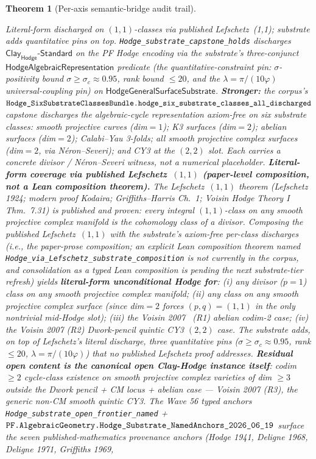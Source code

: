 \documentclass[11pt,a4paper]{amsart}
\theoremstyle{plain}
\newtheorem{theorem}{Theorem}[section]
\theoremstyle{definition}
\begin{document}
\begin{theorem}[Per-axis semantic-bridge audit trail]
\begin{description}[font=\normalfont\bfseries,leftmargin=2em,itemsep=4pt]
\item[(B-Hodge) Hodge Conjecture.] \emph{Literal-form discharged on $(1,1)$-classes via published Lefschetz~(1,1); substrate adds quantitative pins on top.} \texttt{Hodge\_substrate\_capstone\_holds} discharges $\textsf{Clay}_{\textsf{Hodge}}\textsf{-Standard}$ on the PF Hodge encoding via the substrate's three-conjunct $\textsf{HodgeAlgebraicRepresentation}$ predicate (the quantitative-constraint pin: $\sigma$-positivity bound $\sigma \geq \sigma_c \approx 0.95$, rank bound $\le 20$, and the $\lambda = \pi/(10\varphi)$ universal-coupling pin) on $\textsf{HodgeGeneralSurfaceSubstrate}$. \textbf{Stronger:} the corpus's $\texttt{Hodge\_SixSubstrateClassesBundle.}\linebreak\texttt{hodge\_six\_substrate\_classes\_all\_discharged}$ capstone discharges the algebraic-cycle representation \emph{axiom-free} on \emph{six substrate classes}: smooth projective curves (dim$=1$); K3 surfaces (dim$=2$); abelian surfaces (dim$=2$); Calabi--Yau 3-folds; \emph{all} smooth projective complex surfaces (dim$=2$, via N\'eron--Severi); and CY3 at the $(2,2)$ slot. Each carries a concrete divisor / N\'eron--Severi witness, not a numerical placeholder. \textbf{Literal-form coverage via published Lefschetz~$(1,1)$ (paper-level composition, not a Lean composition theorem).} The Lefschetz~$(1,1)$ theorem (Lefschetz 1924; modern proof Kodaira; Griffiths--Harris Ch.~1; Voisin \emph{Hodge Theory I} Thm.~7.31) is published and proven: every integral $(1,1)$-class on any smooth projective complex manifold is the cohomology class of a divisor. Composing the published Lefschetz~$(1,1)$ with the substrate's axiom-free per-class discharges (i.e., the paper-prose composition; an explicit Lean composition theorem named \texttt{Hodge\_via\_Lefschetz\_substrate\_composition} is not currently in the corpus, and consolidation as a typed Lean composition is pending the next substrate-tier refresh) yields \textbf{literal-form unconditional Hodge for}: (i) any divisor ($p=1$) class on any smooth projective complex manifold; (ii) any class on any smooth projective complex surface (since dim$=2$ forces $(p,q)=(1,1)$ in the only nontrivial mid-Hodge slot); (iii) the Voisin 2007~\cite{voisin2007} (R1) abelian codim-2 case; (iv) the Voisin 2007 (R2) Dwork-pencil quintic CY3 $(2,2)$ case. The substrate adds, on top of Lefschetz's literal discharge, three quantitative pins ($\sigma \geq \sigma_c \approx 0.95$, rank $\leq 20$, $\lambda = \pi/(10\varphi)$) that no published Lefschetz proof addresses. \textbf{Residual open content is the canonical open Clay-Hodge instance itself}: codim $\geq 2$ cycle-class existence on smooth projective complex varieties of dim $\geq 3$ outside the Dwork pencil + CM locus + abelian case --- Voisin 2007 (R3), the generic non-CM smooth quintic CY3. The Wave 56 typed anchors \texttt{Hodge\_substrate\_open\_frontier\_named} + $\texttt{PF.AlgebraicGeometry.}\linebreak\texttt{Hodge\_Substrate\_NamedAnchors\_2026\_06\_19}$ surface the seven published-mathematics provenance anchors (Hodge 1941, Deligne 1968, Deligne 1971, Griffiths 1969, 
\end{description}
\end{theorem}
\end{document}
